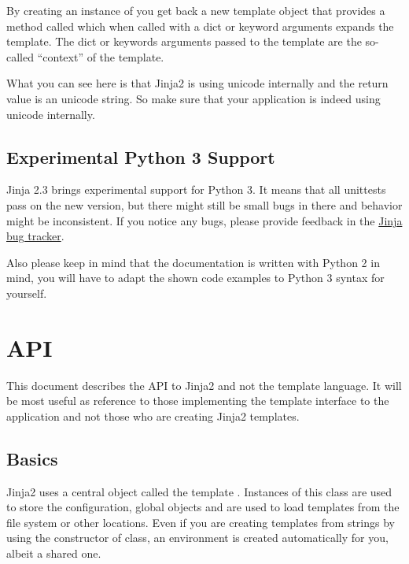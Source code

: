 \documentclass[a4paper,10pt,english]{sphinxmanual}
\begin{document}
By creating an instance of {\hyperref[api:jinja2.Template]{}} you get back a new template
object that provides a method called {\hyperref[api:jinja2.Template.render]{}} which when
called with a dict or keyword arguments expands the template.  The dict
or keywords arguments passed to the template are the so-called ``context''
of the template.

What you can see here is that Jinja2 is using unicode internally and the
return value is an unicode string.  So make sure that your application is
indeed using unicode internally.


\section{Experimental Python 3 Support}
\label{intro:experimental-python-3-support}
Jinja 2.3 brings experimental support for Python 3.  It means that all
unittests pass on the new version, but there might still be small bugs in
there and behavior might be inconsistent.  If you notice any bugs, please
provide feedback in the \href{http://github.com/mitsuhiko/jinja2/issues}{Jinja bug tracker}.

Also please keep in mind that the documentation is written with Python 2
in mind, you will have to adapt the shown code examples to Python 3 syntax
for yourself.


\chapter{API}
\label{api:api}\label{api::doc}\label{api:module-jinja2}\label{api:jinja-bug-tracker}
This document describes the API to Jinja2 and not the template language.  It
will be most useful as reference to those implementing the template interface
to the application and not those who are creating Jinja2 templates.


\section{Basics}
\label{api:basics}
Jinja2 uses a central object called the template {\hyperref[api:jinja2.Environment]{}}.
Instances of this class are used to store the configuration, global objects
and are used to load templates from the file system or other locations.
Even if you are creating templates from strings by using the constructor of
{\hyperref[api:jinja2.Template]{}} class, an environment is created automatically for you,
albeit a shared one.
\end{document}
